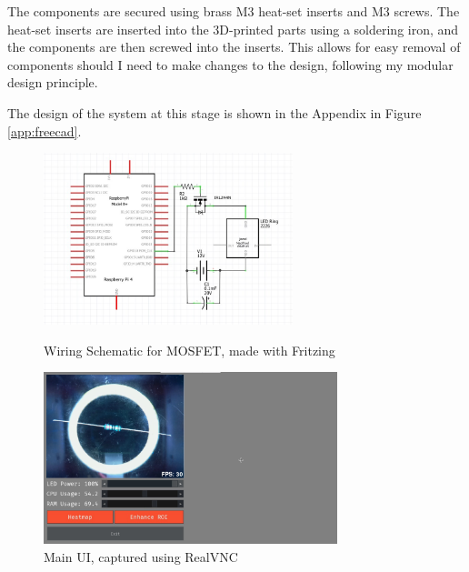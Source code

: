 The components are secured using brass M3 heat-set inserts and M3 screws. The heat-set inserts are inserted into the 3D-printed parts using a soldering iron,
and the components are then screwed into the inserts. This allows for easy removal of components should I need to make changes to the design, following
my modular design principle.

The design of the system at this stage is shown in the Appendix in Figure \ref*{app:freecad}.
\begin{figure}
    \begin{minipage}[t]{0.49\textwidth}
      \centering
      \includegraphics[width=\textwidth,height=5cm, keepaspectratio]{imgs/diagrams/wiring.jpg}
      \caption{Wiring Schematic for MOSFET, made with Fritzing\cite{fritzing}}
      \label{fig:wiringschematic}
    \end{minipage}
    \hfill
    \begin{minipage}[t]{0.49\textwidth}
        \centering
        \includegraphics[width=\textwidth,height=5cm, keepaspectratio]{imgs/software/realvnc.jpg}
        \caption{Main UI, captured using RealVNC\cite{realvnc}}
        \label{fig:mainui}
    \end{minipage}
  \end{figure}
  
